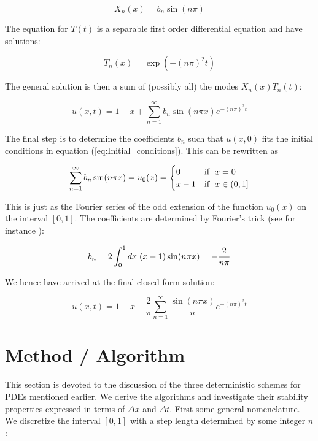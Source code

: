 \documentclass[a4paper, 11pt, notitlepage,english]{article}
\begin{document}
\begin{equation}
X_n(x) = b_n \sin(n\pi)
\label{eq:Separated_X_solution}
\end{equation}

The equation for $T(t)$ is a separable first order differential equation and have solutions:

\begin{equation}
T_n(x) = \exp(-(n\pi)^2t)
\label{eq:Separated_T_solution}
\end{equation}

The general solution is then a sum of (possibly all) the modes $X_n(x)T_n(t)$:

\begin{equation}
u(x,t) = 1-x +\sum_{n=1}^{\infty} b_n \sin(n\pi x) e^{-(n\pi)^2t}
\label{eq:General_solution}
\end{equation}

The final step is to determine the coefficients $b_n$ such that $u(x,0)$ fits the initial conditions in equation (\ref{eq:Initial_conditions}). This can be rewritten as 

\begin{equation}
\sum_{n=1}^{\infty} b_n \sin(n\pi x) = u_0(x) =  \begin{cases} 0 & \mathrm{if} \hspace{2mm} x = 0 \\
x-1 & \mathrm{if} \hspace{2mm} x \in (0,1] \end{cases}
\label{eq:Initial_cond_fit}
\end{equation}

This is just as the Fourier series of the odd extension of the function $u_0(x)$ on the interval $[0,1]$. The coefficients are determined by Fourier's trick (see for instance \cite{Boas}):

\begin{equation}
b_n = 2\int_0^1 dx \hspace{1mm} (x-1) \sin(n\pi x) = -\frac{2}{n\pi}
\label{eq:Fourier_trick}
\end{equation}

We hence have arrived at the final closed form solution:

\begin{equation}
\boxed{u(x,t) = 1-x - \frac{2}{\pi} \sum_{n=1}^{\infty} \frac{\sin(n\pi x)}{n} e^{-(n\pi)^2t}}
\label{eq:Final_solution}
\end{equation}

\section{Method / Algorithm}
This section is devoted to the discussion of the three deterministic schemes for PDEs mentioned earlier. We derive the algorithms and investigate their stability properties expressed in terms of $\Delta x$ and $\Delta t$. First some general nomenclature. We discretize the interval $[0,1]$ with a step length determined by some integer $n$: 
\end{document}
